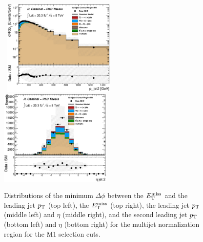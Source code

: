 \begin{figure}[!ht]
\begin{center}
{    }
    \mbox{
      \includegraphics[width=0.495\textwidth]{Appendix_JetSmearingMethod/Figures/plot_Stop_A6_CRqcd_pt2_fitted.eps}
      \includegraphics[width=0.495\textwidth]{Appendix_JetSmearingMethod/Figures/plot_Stop_A6_CRqcd_eta2_fitted.eps}
    }
  \end{center}
  \caption[Distributions of the minimum $\Delta\phi$ between the $\met$ and the leading jet $\pt$, the $\met$, the leading jet $\pt$ and $\eta$, and the second leading jet $\pt$ and $\eta$ for the multijet normalization region corresponding to the M1 selection cuts.]{Distributions of the minimum $\Delta\phi$ between the $\met$ and the leading jet $\pt$ (top left), the $\met$ (top right), the leading jet $\pt$ (middle left) and $\eta$ (middle right), and the second leading jet $\pt$ (bottom left) and $\eta$ (bottom right) for the multijet normalization region for the M1 selection cuts.}
  \label{fig:JetSmearingCheckPlots}
\end{figure}

